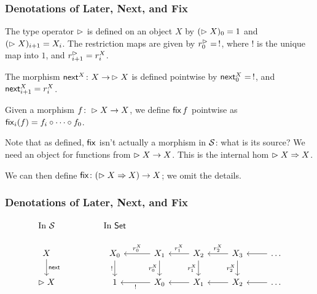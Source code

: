 \documentclass[
	11pt, %
]{beamer}
\begin{document}
\begin{frame}
	\frametitle{Denotations of Later, Next, and Fix}

	The type operator $\vartriangleright$ is defined on an object $X$ by $(\vartriangleright X)_0 = 1$
	and $(\vartriangleright X)_{i+1} = X_i$.
    The restriction maps are given by $r^\vartriangleright_0 =\, !$, where $!$ is the unique map into
	$1$, and $r^\vartriangleright_{i+1} = r^X_i$.

	\medskip
  
	The morphism $\mathsf{next}^X \colon X \to\, \vartriangleright X$ is defined pointwise by $\mathsf{next}^X_0 =\, !$,
	and $\mathsf{next}^X_{i+1} = r^X_i$.

	\medskip

  	Given a morphism $f \colon \vartriangleright X \to X$, we define $\mathsf{fix}\, f$ pointwise
  	as $\mathsf{fix}_i(f) = f_{i} \circ \dots \circ f_0$.

	\bigskip

	Note that as defined, $\mathsf{fix}$ isn't actually a morphism in $\mathcal{S}$: what is its source?
	We need an object for functions from $\vartriangleright X \to X$.
	This is the internal hom $\vartriangleright X \Rightarrow X$.
	
	\medskip
	
	We can then define $\mathsf{fix} \colon (\vartriangleright X \Rightarrow X) \to X$; we omit the details.

\end{frame}

\begin{frame}
	\frametitle{Denotations of Later, Next, and Fix}

\[\begin{tikzcd}[ampersand replacement=\&]
	{\text{In $\calS$}} \&\& {\text{In $\Set$}} \\
	X \&\& {X_0} \& {X_1} \& {X_2} \& {X_3} \& \dots \\
	{\later X} \&\& 1 \& {X_0} \& {X_1} \& {X_2} \& \dots
	\arrow["{r^X_0}"', from=2-4, to=2-3]
	\arrow["{r^X_1}"', from=2-5, to=2-4]
	\arrow["{r^X_2}"', from=2-6, to=2-5]
	\arrow["{!}", from=3-4, to=3-3]
	\arrow[from=3-5, to=3-4]
	\arrow[from=3-6, to=3-5]
	\arrow["\nxt", from=2-1, to=3-1]
	\arrow["{!}"', from=2-3, to=3-3]
	\arrow["{r^X_0}"', from=2-4, to=3-4]
	\arrow["{r^X_1}"', from=2-5, to=3-5]
	\arrow["{r^X_2}"', from=2-6, to=3-6]
	\arrow[from=2-7, to=2-6]
	\arrow[from=3-7, to=3-6]
\end{tikzcd}\]

\end{frame}
\end{document}
